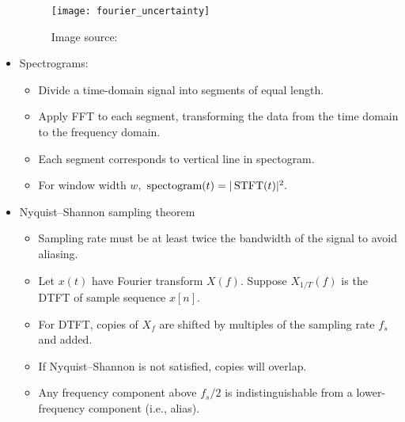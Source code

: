 \begin{itemize}
\begin{figure}[ht]
	\centering
	\texttt{[image: fourier\_uncertainty]}
	\caption*{Image source: \cite{fourier_qiml}}
\end{figure}

\item 
Spectrograms:
	\begin{itemize}
	\item 
	Divide a time-domain signal into segments of equal length.
	
	\item 
	Apply FFT to each segment, transforming the data from the time domain to the frequency domain.
	
	\item 
	Each segment corresponds to vertical line in spectogram.
	
	\item 
	For window width $w,$ $\text{spectogram}(t) = |\operatorname{STFT}(t)|^2.$
	\end{itemize}

\item 
Nyquist–Shannon sampling theorem
	\begin{itemize}
	\item 
	Sampling rate must be at least twice the bandwidth of the signal to avoid aliasing.
	
	\item 
	Let $x(t)$ have Fourier transform $X(f).$ Suppose $X_{1/T}(f)$ is the DTFT of sample sequence $x[n].$ 
	
	\item 
	For DTFT, copies of $X_f$ are shifted by multiples of the sampling rate $f_s$ and added.
	
	\item
	If Nyquist–Shannon is not satisfied, copies will overlap.
	
	\item 
	Any frequency component above $f_s/2$ is indistinguishable from a lower-frequency component (i.e., alias).
	\end{itemize}
\end{itemize}
